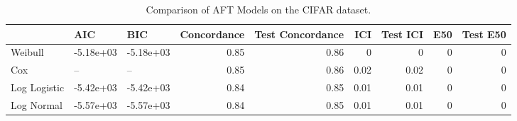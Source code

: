 \begin{table*}
\centering
\caption{Comparison of AFT Models on the CIFAR dataset.}
\label{tab:cifar}
\begin{tabular}{lllrrrrrr}
\toprule
 & AIC & BIC & Concordance & Test Concordance & ICI & Test ICI & E50 & Test E50 \\
\midrule
Weibull & -5.18e+03 & -5.18e+03 & 0.85 & 0.86 & 0 & 0 & 0 & 0 \\
Cox & -- & -- & 0.85 & 0.86 & 0.02 & 0.02 & 0 & 0 \\
Log Logistic & -5.42e+03 & -5.42e+03 & 0.84 & 0.85 & 0.01 & 0.01 & 0 & 0 \\
Log Normal & -5.57e+03 & -5.57e+03 & 0.84 & 0.85 & 0.01 & 0.01 & 0 & 0 \\
\bottomrule
\end{tabular}
\end{table*}
